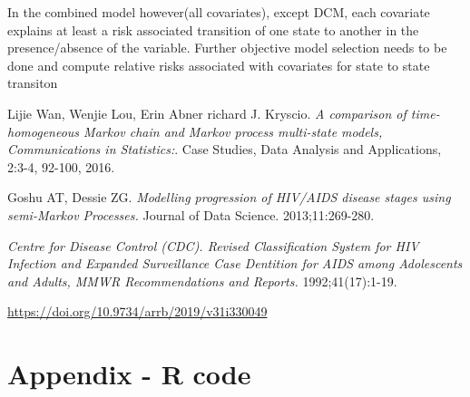 \documentclass[11pt]{article}
\begin{document}
In the combined model however(all covariates), except DCM, each covariate explains at least a risk associated transition of one state to another in the presence/absence of the variable. Further objective model selection needs to be done and compute relative risks associated with covariates for state to state transiton
	
	
	\begin{thebibliography}{9}
	Lijie Wan, Wenjie Lou, Erin Abner richard J. Kryscio. 
	\textit{A comparison of time-homogeneous Markov chain and Markov process multi-state models, Communications in Statistics:}. 
	Case Studies, Data Analysis and Applications, 2:3-4, 92-100, 2016.
	
	
	Goshu AT, Dessie ZG. 
	\textit{Modelling progression of HIV/AIDS disease stages using semi-Markov Processes.} Journal of Data Science. 2013;11:269-280.
	
	\textit{Centre for Disease Control (CDC). Revised Classification System for HIV Infection and Expanded Surveillance Case Dentition for AIDS among Adolescents and Adults, MMWR Recommendations and Reports.} 1992;41(17):1-19.
	
	\url{https://doi.org/10.9734/arrb/2019/v31i330049}

	\end{thebibliography}
	
	\section*{Appendix - R code}\label{appendix}
	
	
\end{document}
